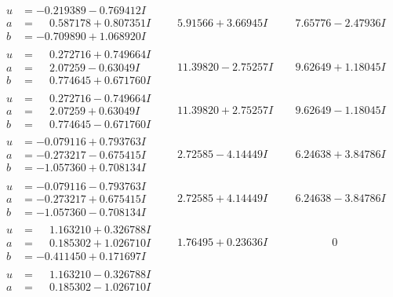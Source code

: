 \documentclass[1p]{elsarticle_modified}
\theoremstyle{definition}
\begin{document}
$$\begin{array}{c|c|c}
\begin{aligned}
u &= -0.219389 - 0.769412 I \\
a &= \phantom{-}0.587178 + 0.807351 I \\
b &= -0.709890 + 1.068920 I\end{aligned}
 & \phantom{-}5.91566 + 3.66945 I & \phantom{-}7.65776 - 2.47936 I \\ \hline\begin{aligned}
u &= \phantom{-}0.272716 + 0.749664 I \\
a &= \phantom{-}2.07259 - 0.63049 I \\
b &= \phantom{-}0.774645 + 0.671760 I\end{aligned}
 & \phantom{-}11.39820 - 2.75257 I & \phantom{-}9.62649 + 1.18045 I \\ \hline\begin{aligned}
u &= \phantom{-}0.272716 - 0.749664 I \\
a &= \phantom{-}2.07259 + 0.63049 I \\
b &= \phantom{-}0.774645 - 0.671760 I\end{aligned}
 & \phantom{-}11.39820 + 2.75257 I & \phantom{-}9.62649 - 1.18045 I \\ \hline\begin{aligned}
u &= -0.079116 + 0.793763 I \\
a &= -0.273217 - 0.675415 I \\
b &= -1.057360 + 0.708134 I\end{aligned}
 & \phantom{-}2.72585 - 4.14449 I & \phantom{-}6.24638 + 3.84786 I \\ \hline\begin{aligned}
u &= -0.079116 - 0.793763 I \\
a &= -0.273217 + 0.675415 I \\
b &= -1.057360 - 0.708134 I\end{aligned}
 & \phantom{-}2.72585 + 4.14449 I & \phantom{-}6.24638 - 3.84786 I \\ \hline\begin{aligned}
u &= \phantom{-}1.163210 + 0.326788 I \\
a &= \phantom{-}0.185302 + 1.026710 I \\
b &= -0.411450 + 0.171697 I\end{aligned}
 & \phantom{-}1.76495 + 0.23636 I & \phantom{-0.000000 } 0 \\ \hline\begin{aligned}
u &= \phantom{-}1.163210 - 0.326788 I \\
a &= \phantom{-}0.185302 - 1.026710 I \\

\end{aligned}
\end{array}$$
\end{document}

